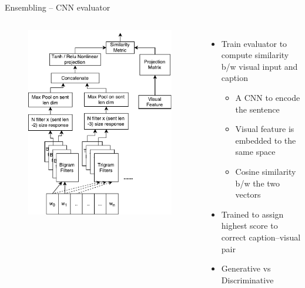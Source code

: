 \documentclass{beamer}
\begin{document}
\begin{frame}{Ensembling -- CNN evaluator}
\begin{columns}       
    \begin{figure}[h]
        \centering
        \includegraphics[width=1.0\textwidth]{images/CnnEval.pdf}
        \vfill
    \end{figure}
    \begin{itemize}
        \item Train evaluator to compute similarity b/w visual input and caption 
           \begin{itemize}
               \item A CNN to encode the sentence 
               \item Visual feature is embedded to the same space 
               \item Cosine similarity b/w the two vectors 
           \end{itemize}
        \item Trained to assign highest score to correct caption--visual pair 
        \item Generative vs Discriminative 
    \end{itemize}
\end{columns}
\end{frame}
\end{document}
